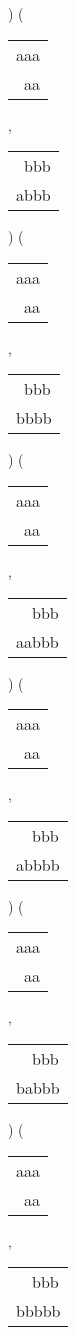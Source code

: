 ) 
 ( 
\begin{tabular}{|l|} \hline
aaa \\
\ aa \\
\hline
\end{tabular} 
 , 
\begin{tabular}{|l|} \hline
\ bbb \\
abbb \\
\hline
\end{tabular} 
) 
 ( 
\begin{tabular}{|l|} \hline
aaa \\
\ aa \\
\hline
\end{tabular} 
 , 
\begin{tabular}{|l|} \hline
\ bbb \\
bbbb \\
\hline
\end{tabular} 
) 
 ( 
\begin{tabular}{|l|} \hline
aaa \\
\ aa \\
\hline
\end{tabular} 
 , 
\begin{tabular}{|l|} \hline
\ \ bbb \\
aabbb \\
\hline
\end{tabular} 
) 
 ( 
\begin{tabular}{|l|} \hline
aaa \\
\ aa \\
\hline
\end{tabular} 
 , 
\begin{tabular}{|l|} \hline
\ \ bbb \\
abbbb \\
\hline
\end{tabular} 
) 
 ( 
\begin{tabular}{|l|} \hline
aaa \\
\ aa \\
\hline
\end{tabular} 
 , 
\begin{tabular}{|l|} \hline
\ \ bbb \\
babbb \\
\hline
\end{tabular} 
) 
 ( 
\begin{tabular}{|l|} \hline
aaa \\
\ aa \\
\hline
\end{tabular} 
 , 
\begin{tabular}{|l|} \hline
\ \ bbb \\
bbbbb \\
\hline
\end{tabular} 
